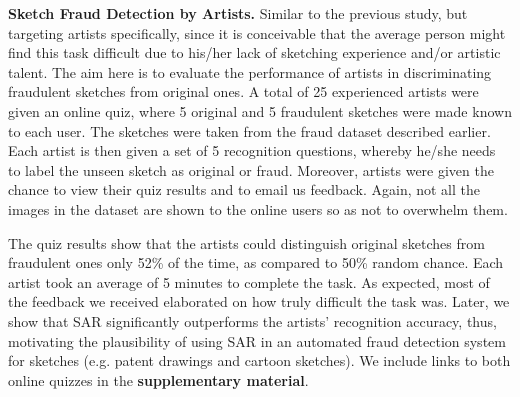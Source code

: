 \noindent\textbf{Sketch Fraud Detection by Artists.} Similar to the previous study, but targeting artists specifically, since it is conceivable that the average person might find this task difficult due to his/her lack of sketching experience and/or artistic talent. The aim here is to evaluate the performance of artists in discriminating fraudulent sketches from original ones. A total of 25 experienced artists were given an online quiz, where 5 original and 5 fraudulent sketches were made known to each user. The sketches were taken from the fraud dataset described earlier. Each artist is then given a set of 5 recognition questions, whereby he/she needs to label the unseen sketch as original or fraud. Moreover, artists were given the chance to view their quiz results and to email us feedback. Again, not all the images in the dataset are shown to the online users so as not to overwhelm them.

The quiz results show that the artists could distinguish original sketches from fraudulent ones only 52\% of the time, as compared to 50\% random chance. Each artist took an average of 5 minutes to complete the task. As expected, most of the feedback we received elaborated on how truly difficult the task was. Later, we show that SAR significantly outperforms the artists' recognition accuracy, thus, motivating the plausibility of using SAR in an automated fraud detection system for sketches (e.g. patent drawings and cartoon sketches). We include links to both online quizzes in the \textbf{supplementary material}.
